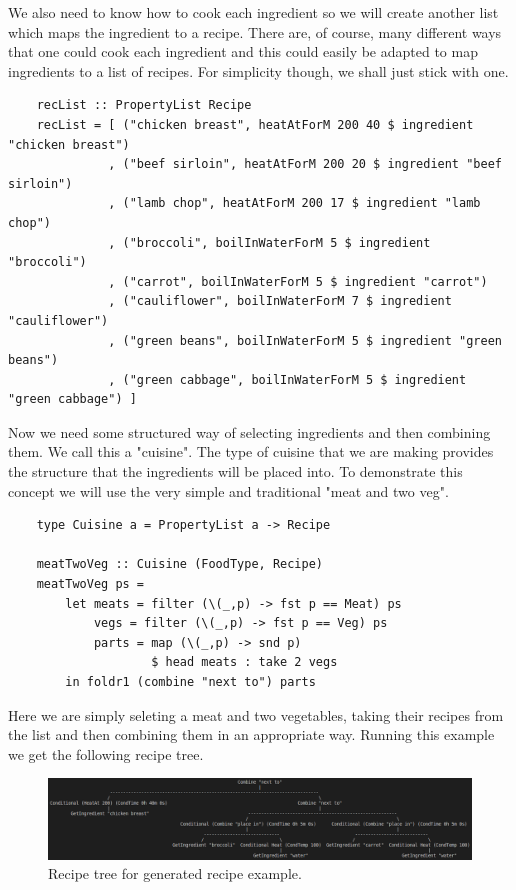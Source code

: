 \documentclass[11pt]{article}
\begin{document}
We also need to know how to cook each ingredient so we will create another
list which maps the ingredient to a recipe. There are, of course, many different
ways that one could cook each ingredient and this could easily be adapted to
map ingredients to a list of recipes. For simplicity though, we shall just
stick with one.

\begin{lstlisting}
    recList :: PropertyList Recipe
    recList = [ ("chicken breast", heatAtForM 200 40 $ ingredient "chicken breast")
              , ("beef sirloin", heatAtForM 200 20 $ ingredient "beef sirloin")
              , ("lamb chop", heatAtForM 200 17 $ ingredient "lamb chop")
              , ("broccoli", boilInWaterForM 5 $ ingredient "broccoli")
              , ("carrot", boilInWaterForM 5 $ ingredient "carrot")
              , ("cauliflower", boilInWaterForM 7 $ ingredient "cauliflower")
              , ("green beans", boilInWaterForM 5 $ ingredient "green beans")
              , ("green cabbage", boilInWaterForM 5 $ ingredient "green cabbage") ]
\end{lstlisting}

Now we need some structured way of selecting ingredients and then combining
them. We call this a "cuisine". The type of cuisine that we are making provides
the structure that the ingredients will be placed into. To demonstrate this
concept we will use the very simple and traditional "meat and two veg".

\begin{lstlisting}
    type Cuisine a = PropertyList a -> Recipe

    meatTwoVeg :: Cuisine (FoodType, Recipe)
    meatTwoVeg ps =
        let meats = filter (\(_,p) -> fst p == Meat) ps
            vegs = filter (\(_,p) -> fst p == Veg) ps
            parts = map (\(_,p) -> snd p)
                    $ head meats : take 2 vegs
        in foldr1 (combine "next to") parts
\end{lstlisting}

Here we are simply seleting a meat and two vegetables, taking their
recipes from the list and then combining them in an appropriate way.
Running this example we get the following recipe tree.

\begin{figure}[h]
\includegraphics[width=\textwidth, keepaspectratio]{meatTwoVeg.png}
\centering
\caption{Recipe tree for generated recipe example.}
\end{figure}
\end{document}
